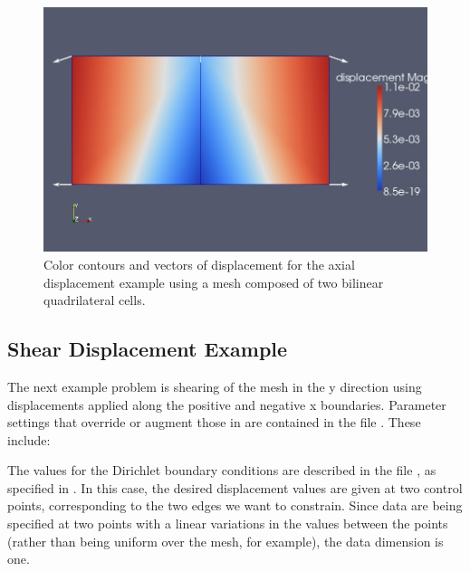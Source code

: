 \begin{figure}[htbp]
\includegraphics[scale=0.33]{examples/figs/twoquad4-axialdisp}
\caption{Color contours and vectors of displacement for the axial displacement
  example using a mesh composed of two bilinear quadrilateral cells.}
\label{fig:twoquad4-axial}
\end{figure}


\subsection{Shear Displacement Example}

The next example problem is shearing of the mesh in the y direction
using displacements applied along the positive and negative x
boundaries.  Parameter settings that override or augment those in
 are contained in the file
. These include:
\begin{inventory}
\end{inventory}
The values for the Dirichlet boundary conditions are described in the
file , as specified in
.  In this case, the desired displacement
values are given at two control points, corresponding to the two edges
we want to constrain. Since data are being specified at two points
with a linear variations in the values between the points (rather than
being uniform over the mesh, for example), the data dimension is one.

